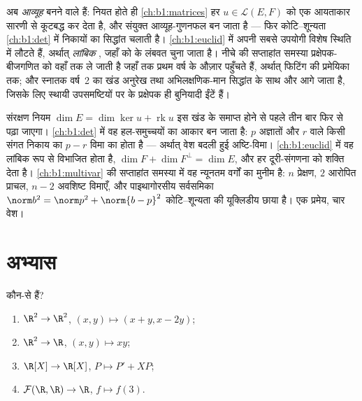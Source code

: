 \begin{remark}[ये प्रतिचित्रण कहाँ जाते हैं]
\label{rem:b1:linmaps:whereused}
 अब \emph{आव्यूह} बनने वाले हैं:  नियत होते ही
\cref{ch:b1:matrices} हर $u \in \mathcal{L}(E, F)$ को एक आयताकार सारणी से
कूटबद्ध कर देता है, और संयुक्त  आव्यूह-गुणनफल बन जाता है --- फिर
कोटि--शून्यता \cref{ch:b1:det} में  निकायों का सिद्धांत चलाती है।
 \cref{ch:b1:euclid} में अपनी सबसे उपयोगी विशेष स्थिति में लौटते
हैं, अर्थात् \emph{लांबिक} , जहाँ  को  के लंबवत चुना
जाता है। नीचे की सप्ताहांत समस्या प्रक्षेपक-बीजगणित को वहाँ तक ले जाती है
जहाँ तक प्रथम वर्ष के औज़ार पहुँचते हैं, अर्थात् फिटिंग की प्रमेयिका तक; और
स्नातक वर्ष~2 का खंड अनुरेख तथा अभिलक्षणिक-मान सिद्धांत के साथ और आगे जाता
है, जिसके लिए स्थायी उपसमष्टियों पर के प्रक्षेपक ही बुनियादी ईंटें हैं।
\end{remark}

\begin{remark}[पुस्तक 3 के भीतर के परिदृश्य: कोटि--शून्यता तीन बार और]
\label{rem:b1:linmaps:perspectives}
संरक्षण नियम $\dim E = \dim\ker u + \operatorname{rk} u$ इस खंड के समाप्त
होने से पहले तीन बार फिर से पढ़ा जाएगा। \cref{ch:b1:det} में वह हल-समुच्चयों
का आकार बन जाता है: $p$ अज्ञातों और  $r$ वाले किसी संगत निकाय का
 $p - r$ विमा का होता है --- अर्थात् वेश बदली हुई अष्टि-विमा।
\cref{ch:b1:euclid} में वह लांबिक रूप से विभाजित होता है, $\dim F + \dim
F^\perp = \dim E$, और हर दूरी-संगणना को शक्ति देता है। \cref{ch:b1:multivar}
की सप्ताहांत समस्या में वह न्यूनतम वर्गों का मुनीम है: $n$ प्रेक्षण, $2$
आरोपित प्राचल, $n - 2$ अवशिष्ट विमाएँ, और पाइथागोरसीय सर्वसमिका $\norm b^2 =
\norm p^2 + \norm{b - p}^2$ कोटि--शून्यता की यूक्लिडीय छाया है। एक प्रमेय,
चार वेश।
\end{remark}

\section{अभ्यास}

\begin{exercise}[$\star$]\label{exo:b1:linmaps:1}
कौन-से   हैं?
\begin{enumerate}
  \item $\R^2 \to \R^2$, $(x, y) \mapsto (x + y, x - 2y)$;
  \item $\R^2 \to \R$, $(x, y) \mapsto xy$;
  \item $\R[X] \to \R[X]$, $P \mapsto P' + XP$;
  \item $\mathcal{F}(\R,\R) \to \R$, $f \mapsto f(3)$.
\end{enumerate}
\end{exercise}

